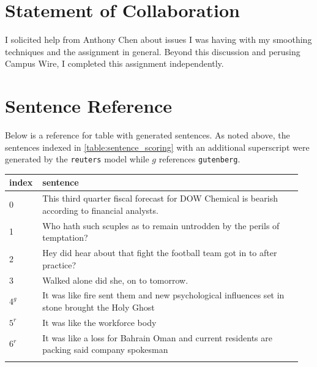 \documentclass[11pt,a4paper]{article}
\begin{document}

\section{Statement of Collaboration}

I solicited help from Anthony Chen about issues I was having with 
my smoothing techniques and the assignment in general. Beyond this discussion and perusing 
Campus Wire, I completed this assignment independently.







\appendix
  \label{appendix}

\section{Sentence Reference}%
\label{sec:sentence_ref}

Below is a reference for table with generated sentences. As noted above, the sentences indexed in \ref{table:sentence_scoring} with an additional superscript were generated by the \texttt{reuters} model while $g$ references \texttt{gutenberg}.

\vspace{4mm}
\begin{tabular}{p{0.1\linewidth}|p{0.85\linewidth}}
\hline
   index & sentence                                                                                        \\
\hline
       0 & This third quarter fiscal forecast for DOW Chemical is bearish according to financial analysts. \\
       1 & Who hath such scuples as to remain untrodden by the perils of temptation?                       \\
       2 & Hey did hear about that fight the football team got in to after practice?                       \\
       3 & Walked alone did she, on to tomorrow.                                                           \\
       $4^g$ & It was like fire sent them and new psychological influences set in stone brought the Holy Ghost \\
       $5^r$ & It was like the workforce body                                                                  \\
       $6^r$ & It was like a loss for Bahrain Oman and current residents are packing said company spokesman    \\
\hline
\label{table:sentence_reference}
\end{tabular}
\end{document}
